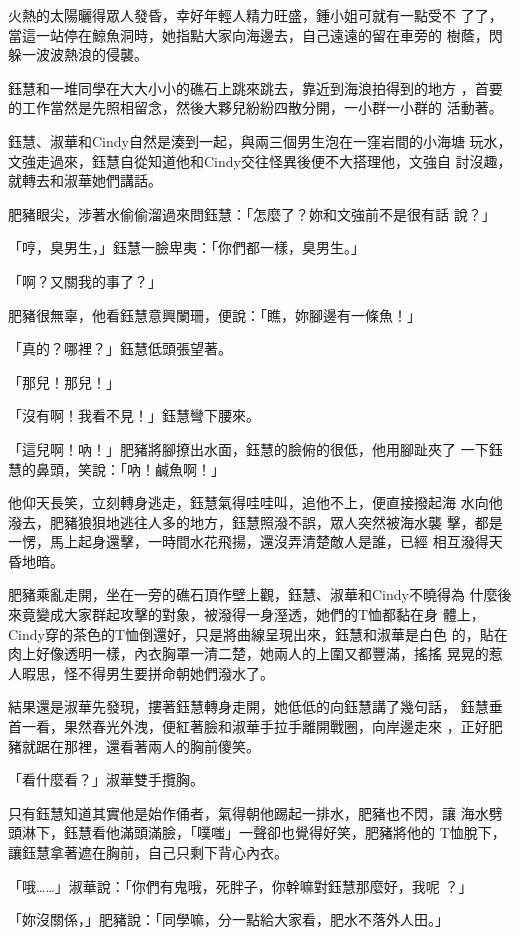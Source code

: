 火熱的太陽曬得眾人發昏，幸好年輕人精力旺盛，鍾小姐可就有一點受不
了了，當這一站停在鯨魚洞時，她指點大家向海邊去，自己遠遠的留在車旁的
樹蔭，閃躲一波波熱浪的侵襲。

鈺慧和一堆同學在大大小小的礁石上跳來跳去，靠近到海浪拍得到的地方
，首要的工作當然是先照相留念，然後大夥兒紛紛四散分開，一小群一小群的
活動著。

鈺慧、淑華和Cindy自然是湊到一起，與兩三個男生泡在一窪岩間的小海塘
玩水，文強走過來，鈺慧自從知道他和Cindy交往怪異後便不大搭理他，文強自
討沒趣，就轉去和淑華她們講話。

肥豬眼尖，涉著水偷偷溜過來問鈺慧：「怎麼了？妳和文強前不是很有話
說？」

「哼，臭男生，」鈺慧一臉卑夷：「你們都一樣，臭男生。」

「啊？又關我的事了？」

肥豬很無辜，他看鈺慧意興闌珊，便說：「瞧，妳腳邊有一條魚！」

「真的？哪裡？」鈺慧低頭張望著。

「那兒！那兒！」

「沒有啊！我看不見！」鈺慧彎下腰來。

「這兒啊！吶！」肥豬將腳撩出水面，鈺慧的臉俯的很低，他用腳趾夾了
一下鈺慧的鼻頭，笑說：「吶！鹹魚啊！」

他仰天長笑，立刻轉身逃走，鈺慧氣得哇哇叫，追他不上，便直接撥起海
水向他潑去，肥豬狼狽地逃往人多的地方，鈺慧照潑不誤，眾人突然被海水襲
擊，都是一愣，馬上起身還擊，一時間水花飛揚，還沒弄清楚敵人是誰，已經
相互潑得天昏地暗。

肥豬乘亂走開，坐在一旁的礁石頂作壁上觀，鈺慧、淑華和Cindy不曉得為
什麼後來竟變成大家群起攻擊的對象，被潑得一身溼透，她們的T恤都黏在身
體上，Cindy穿的茶色的T恤倒還好，只是將曲線呈現出來，鈺慧和淑華是白色
的，貼在肉上好像透明一樣，內衣胸罩一清二楚，她兩人的上圍又都豐滿，搖搖
晃晃的惹人暇思，怪不得男生要拼命朝她們潑水了。

結果還是淑華先發現，摟著鈺慧轉身走開，她低低的向鈺慧講了幾句話，
鈺慧垂首一看，果然春光外洩，便紅著臉和淑華手拉手離開戰圈，向岸邊走來
，正好肥豬就踞在那裡，還看著兩人的胸前傻笑。

「看什麼看？」淑華雙手攬胸。

只有鈺慧知道其實他是始作俑者，氣得朝他踢起一排水，肥豬也不閃，讓
海水劈頭淋下，鈺慧看他滿頭滿臉，「噗嗤」一聲卻也覺得好笑，肥豬將他的
T恤脫下，讓鈺慧拿著遮在胸前，自己只剩下背心內衣。

「哦……」淑華說：「你們有鬼哦，死胖子，你幹嘛對鈺慧那麼好，我呢
？」

「妳沒關係，」肥豬說：「同學嘛，分一點給大家看，肥水不落外人田。」

